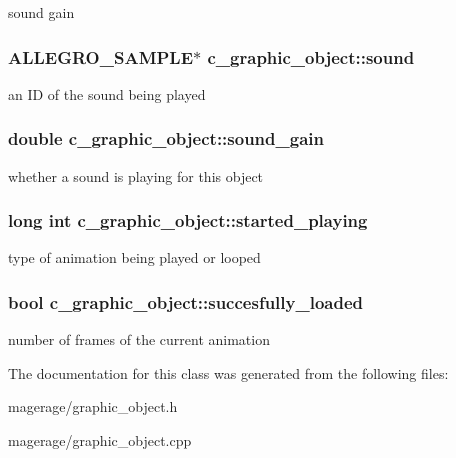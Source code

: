 sound gain \hypertarget{classc__graphic__object_a4076fe5b3cd2e8bcb249f54fb86d662f}{
\subsubsection[{sound}]{\setlength{\rightskip}{0pt plus 5cm}A\-L\-L\-E\-G\-R\-O\-\_\-\-S\-A\-M\-P\-L\-E$\ast$ c\-\_\-graphic\-\_\-object\-::sound\hspace{0.3cm}{\ttfamily [protected]}}}\label{classc__graphic__object_a4076fe5b3cd2e8bcb249f54fb86d662f}
an I\-D of the sound being played \hypertarget{classc__graphic__object_a8274f6e9f1221b91be61ca923e1dc03c}{
\subsubsection[{sound\-\_\-gain}]{\setlength{\rightskip}{0pt plus 5cm}double c\-\_\-graphic\-\_\-object\-::sound\-\_\-gain\hspace{0.3cm}{\ttfamily [protected]}}}\label{classc__graphic__object_a8274f6e9f1221b91be61ca923e1dc03c}
whether a sound is playing for this object \hypertarget{classc__graphic__object_a48b5ab1a193f296ead7119461a4e425e}{
\subsubsection[{started\-\_\-playing}]{\setlength{\rightskip}{0pt plus 5cm}long int c\-\_\-graphic\-\_\-object\-::started\-\_\-playing\hspace{0.3cm}{\ttfamily [protected]}}}\label{classc__graphic__object_a48b5ab1a193f296ead7119461a4e425e}
type of animation being played or looped \hypertarget{classc__graphic__object_ad1d6ffa4b597a667995ec1e8c930a9f9}{
\subsubsection[{succesfully\-\_\-loaded}]{\setlength{\rightskip}{0pt plus 5cm}bool c\-\_\-graphic\-\_\-object\-::succesfully\-\_\-loaded\hspace{0.3cm}{\ttfamily [protected]}}}\label{classc__graphic__object_ad1d6ffa4b597a667995ec1e8c930a9f9}
number of frames of the current animation 

The documentation for this class was generated from the following files\-:\begin{DoxyCompactItemize}
\item 
magerage/graphic\-\_\-object.\-h\item 
magerage/graphic\-\_\-object.\-cpp\end{DoxyCompactItemize}
